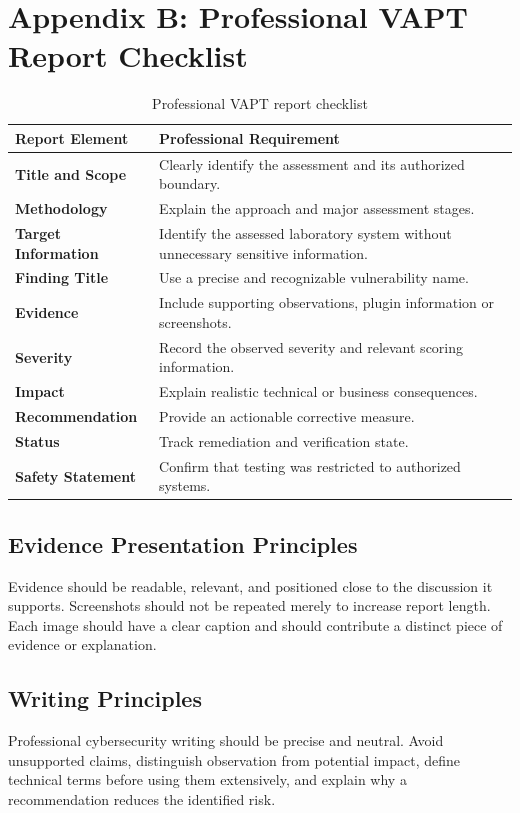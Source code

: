 \documentclass[11pt,a4paper]{article}
\begin{document}
\newpage
\section{Appendix B: Professional VAPT Report Checklist}
\begin{table}[H]\centering
\small
\begin{tabularx}{\textwidth}{>{\bfseries}p{3.6cm}X}
\toprule
Report Element & Professional Requirement\\
\midrule
Title and Scope & Clearly identify the assessment and its authorized boundary.\\
Methodology & Explain the approach and major assessment stages.\\
Target Information & Identify the assessed laboratory system without unnecessary sensitive information.\\
Finding Title & Use a precise and recognizable vulnerability name.\\
Evidence & Include supporting observations, plugin information or screenshots.\\
Severity & Record the observed severity and relevant scoring information.\\
Impact & Explain realistic technical or business consequences.\\
Recommendation & Provide an actionable corrective measure.\\
Status & Track remediation and verification state.\\
Safety Statement & Confirm that testing was restricted to authorized systems.\\
\bottomrule
\end{tabularx}
\caption{Professional VAPT report checklist}
\end{table}

\subsection{Evidence Presentation Principles}
Evidence should be readable, relevant, and positioned close to the discussion it supports. Screenshots should not be repeated merely to increase report length. Each image should have a clear caption and should contribute a distinct piece of evidence or explanation.

\subsection{Writing Principles}
Professional cybersecurity writing should be precise and neutral. Avoid unsupported claims, distinguish observation from potential impact, define technical terms before using them extensively, and explain why a recommendation reduces the identified risk.
\end{document}
